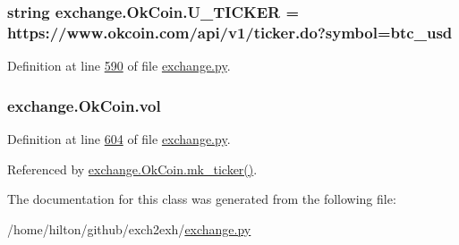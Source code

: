 \subsubsection[{\texorpdfstring{U\+\_\+\+T\+I\+C\+K\+ER}{U_TICKER}}]{\setlength{\rightskip}{0pt plus 5cm}string exchange.\+Ok\+Coin.\+U\+\_\+\+T\+I\+C\+K\+ER = \textquotesingle{}https\+://www.\+okcoin.\+com/api/v1/ticker.\+do?symbol=btc\+\_\+usd\textquotesingle{}\hspace{0.3cm}{\ttfamily [static]}}\hypertarget{classexchange_1_1_ok_coin_a81305ced2eb23b94feb7195d1d42afc2}{}\label{classexchange_1_1_ok_coin_a81305ced2eb23b94feb7195d1d42afc2}


Definition at line \hyperlink{exchange_8py_source_l00590}{590} of file \hyperlink{exchange_8py_source}{exchange.\+py}.

\subsubsection[{\texorpdfstring{vol}{vol}}]{\setlength{\rightskip}{0pt plus 5cm}exchange.\+Ok\+Coin.\+vol}\hypertarget{classexchange_1_1_ok_coin_ad0e78d6b3c0a24504be72a0216fc6549}{}\label{classexchange_1_1_ok_coin_ad0e78d6b3c0a24504be72a0216fc6549}


Definition at line \hyperlink{exchange_8py_source_l00604}{604} of file \hyperlink{exchange_8py_source}{exchange.\+py}.



Referenced by \hyperlink{exchange_8py_source_l00622}{exchange.\+Ok\+Coin.\+mk\+\_\+ticker()}.



The documentation for this class was generated from the following file\+:\begin{DoxyCompactItemize}
\item 
/home/hilton/github/exch2exh/\hyperlink{exchange_8py}{exchange.\+py}\end{DoxyCompactItemize}
